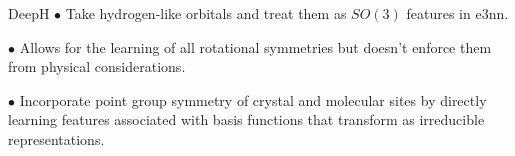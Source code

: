 \documentclass[11pt]{beamer}
\begin{document}
\begin{frame}{DeepH}
$\bullet$ Take hydrogen-like orbitals and treat them as $SO(3)$ features in e3nn. 

\medskip

$\bullet$ Allows for the learning of all rotational symmetries but doesn't enforce them from physical considerations.


\end{frame}

\begin{frame}{}
$\bullet$ Incorporate point group symmetry of crystal and molecular sites by directly learning features associated with basis functions that transform as irreducible representations.


\end{frame}
\end{document}
